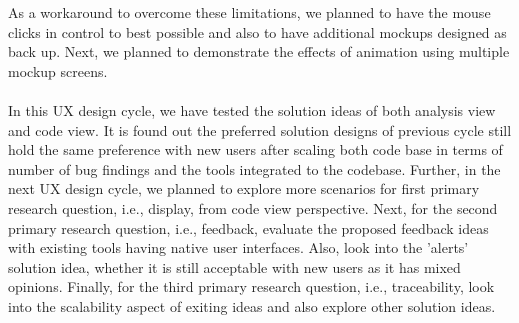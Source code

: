 As a workaround to overcome these limitations, we planned to have the mouse clicks in control to best possible and also to have additional mockups designed as back up. Next, we planned to demonstrate the effects of animation using multiple mockup screens. \\ \\

In this UX design cycle, we have tested the solution ideas of both analysis view and code view. It is found out the preferred solution designs of previous cycle still hold the same preference with new users after scaling both code base in terms of number of bug findings and the tools integrated to the codebase. Further, in the next UX design cycle, we planned to explore more scenarios for first primary research question, i.e., display, from code view perspective. Next, for the second primary research question, i.e., feedback, evaluate the proposed feedback ideas with existing tools having native user interfaces. Also, look into the 'alerts' solution idea, whether it is still acceptable with new users as it has mixed opinions. Finally, for the third primary research question, i.e., traceability, look into the scalability aspect of exiting ideas and also explore other solution ideas.